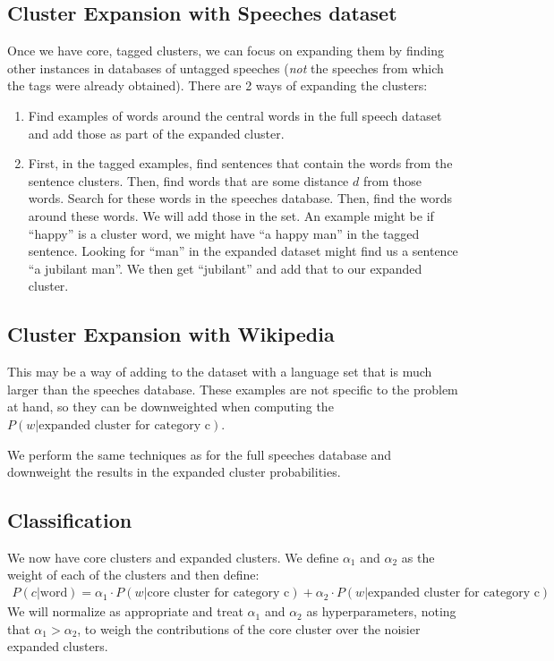 \documentclass[letterpaper]{article}
\begin{document}
\subsection*{Cluster Expansion with Speeches dataset}
Once we have core, tagged clusters, we can focus on expanding them by finding other instances in databases of untagged speeches (\emph{not} the speeches from which the tags were already obtained). There are 2 ways of expanding the clusters:
\begin{enumerate}
	\item Find examples of words around the central words in the full speech dataset and add those as part of the expanded cluster.
	\item First, in the tagged examples, find sentences that contain the words from the sentence clusters. Then, find words that are some distance $d$ from those words. Search for these words in the speeches database. Then, find the words around these words. We will add those in the set. An example might be if ``happy'' is a cluster word, we might have ``a happy man'' in the tagged sentence. Looking for ``man'' in the expanded dataset might find us a sentence ``a jubilant man''. We then get ``jubilant'' and add that to our expanded cluster.
\end{enumerate}
\subsection*{Cluster Expansion with Wikipedia}
This may be a way of adding to the dataset with a language set that is much larger than the speeches database. These examples are not specific to the problem at hand, so they can be downweighted when computing the $P(w | \text{expanded cluster for category c})$. 

We perform the same techniques as for the full speeches database and downweight the results in the expanded cluster probabilities.

\subsection*{Classification}
We now have core clusters and expanded clusters. We define $\alpha_1$ and $\alpha_2$ as the weight of each of the clusters and then define:
\begin{eqnarray*}
P(c | \text{word}) = \alpha_1 \cdot P(w | \text{core cluster for category c}) + \alpha_2 \cdot P(w | \text{expanded cluster for category c})
\end{eqnarray*}
We will normalize as appropriate and treat $\alpha_1$ and $\alpha_2$ as hyperparameters, noting that $\alpha_1 > \alpha_2$, to weigh the contributions of the core cluster over the noisier expanded clusters. 
\end{document}
